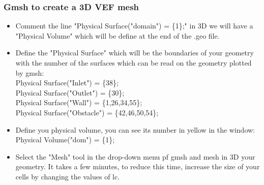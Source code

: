 \documentclass[10pt, hyperref={unicode=true,pdfusetitle, bookmarks=true,bookmarksnumbered=false,bookmarksopen=false, breaklinks=false,pdfborder={0 0l 1},backref=true,colorlinks=true,linkcolor=darkblue,pageanchor}]{beamer}
\begin{document}
\begin{frame}
\frametitle{Gmsh to create a 3D VEF mesh}
\begin{block}{}

\begin{itemize}
\item Comment the line "Physical Surface("domain") = \{1\};" in 3D we will have a "Physical Volume" which will be define at the end of the .geo file.
\item Define the "Physical Surface" which will be the boundaries of your geometry with the number of the surfaces which can be read on the geometry plotted by gmsh:\\
Physical Surface("Inlet") = \{38\};\\
Physical Surface("Outlet") = \{30\};\\
Physical Surface("Wall") = \{1,26,34,55\};\\
Physical Surface("Obstacle") = \{42,46,50,54\};\\
\item Define you physical volume, you can see its number in yellow in the window:\\
Physical Volume("dom") = \{1\};


\item Select the "Mesh" tool in the drop-down menu pf gmsh and mesh in 3D your geometry. It takes a few minutes, to reduce this time, increase the size of your cells by changing the values of lc.
\end{itemize}

\end{block}
\end{frame}
\end{document}
